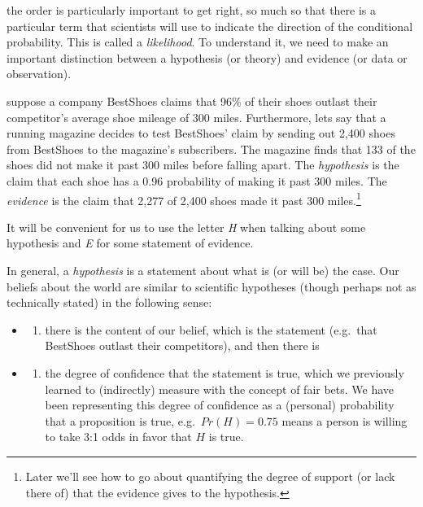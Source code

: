\documentclass[]{tufte-book}
\providecommand{\tightlist}{%
  \setlength{\itemsep}{0pt}\setlength{\parskip}{0pt}}
\begin{document}
 the order is particularly important to get right, so much so that there is a particular term that scientists will use to indicate the direction of the conditional probability. This is called a \emph{likelihood}. To understand it, we need to make an important distinction between a hypothesis (or theory) and evidence (or data or observation).

 suppose a company BestShoes claims that 96\% of their shoes outlast their competitor's average shoe mileage of 300 miles. Furthermore, lets say that a running magazine decides to test BestShoes' claim by sending out 2,400 shoes from BestShoes to the magazine's subscribers. The magazine finds that 133 of the shoes did not make it past 300 miles before falling apart. The \emph{hypothesis} is the claim that each shoe has a 0.96 probability of making it past 300 miles. The \emph{evidence} is the claim that 2,277 of 2,400 shoes made it past 300 miles.\footnote{Later we'll see how to go about quantifying the degree of support (or lack there of) that the evidence gives to the hypothesis.}

It will be convenient for us to use the letter \emph{H} when talking about some hypothesis and \emph{E} for some statement of evidence.

In general, a \emph{hypothesis} is a statement about what is (or will be) the case. Our beliefs about the world are similar to scientific hypotheses (though perhaps not as technically stated) in the following sense:

\begin{itemize}
\item
  \begin{enumerate}
  \def\labelenumi{\roman{enumi})}
  \tightlist
  \item
    there is the content of our belief, which is the statement (e.g.~that BestShoes outlast their competitors), and then there is
  \end{enumerate}
\item
  \begin{enumerate}
  \def\labelenumi{\roman{enumi})}
  \setcounter{enumi}{1}
  \tightlist
  \item
    the degree of confidence that the statement is true, which we previously learned to (indirectly) measure with the concept of fair bets. We have been representing this degree of confidence as a (personal) probability that a proposition is true, e.g.~\(Pr(H)=0.75\) means a person is willing to take 3:1 odds in favor that \(H\) is true.
  \end{enumerate}
\end{itemize}
\end{document}

